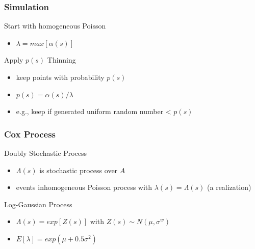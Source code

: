 \documentclass[nototal,handout]{beamer}
\begin{document}
\begin{frame}
  \frametitle{Simulation}
  \begin{block}{Start with homogeneous Poisson}
    \begin{itemize}
      \item $\lambda = max [ \alpha(s) ] $
    \end{itemize}
   \end{block}
 \begin{block}{Apply $p(s)$ Thinning}
	\begin{itemize}
	  \item keep points with probability $p(s)$
	  \item $p(s) = \alpha(s) /  \lambda$
	  \item e.g., keep if generated uniform random number < $p(s)$
	\end{itemize}
   \end{block}
\end{frame}

\begin{frame}
  \frametitle{Cox Process}
  \begin{block}{Doubly Stochastic Process}
    \begin{itemize}
      \item $\Lambda(s)$ is stochastic process over $A$
      \item events inhomogeneous Poisson process with $\lambda(s) =
	\Lambda(s)$ (a realization)
    \end{itemize}
   \end{block}
 \begin{block}{Log-Gaussian Process}
    \begin{itemize}
      \item $\Lambda(s)= exp[Z(s)]$ with $Z(s) \sim N(\mu, \sigma^w)$
      \item $E[\lambda] = exp(\mu + 0.5 \sigma^2)$
    \end{itemize}
   \end{block}
\end{frame}
\end{document}
